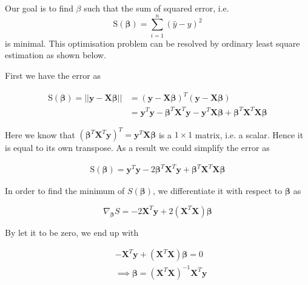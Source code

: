  \begin{mscproof}
 	 Our goal is to find $\beta$ such that the sum of squared error, i.e. $$\text{S}(\boldsymbol{\beta})=\sum_{i=1}^n(\hat{y}-y)^2$$ is minimal. This optimisation problem can be resolved by ordinary least square estimation as shown below.
 
 First we have the error as
 
 \begin{equation}
 \begin{split}
 \text{S}(\boldsymbol{\beta})=||\boldsymbol{y}-\boldsymbol{X} \boldsymbol{\beta}||& =(\boldsymbol{y}-\boldsymbol{X}\boldsymbol{\beta})^T(\boldsymbol{y}-\boldsymbol{X}\boldsymbol{\beta})\\
 	& =\boldsymbol{y}^T\boldsymbol{y}-\boldsymbol{\beta}^T\boldsymbol{X}^T\boldsymbol{y}-\boldsymbol{y}^T\boldsymbol{X}\boldsymbol{\beta}+\boldsymbol{\beta}^T\boldsymbol{X}^T\boldsymbol{X}\boldsymbol{\beta}
\end{split}
 \end{equation}
 
 Here we know that $(\boldsymbol{\beta}^T\boldsymbol{X}^T\boldsymbol{y})^T=\boldsymbol{y}^T\boldsymbol{X}\boldsymbol{\beta}$ is a $1\times 1$ matrix, i.e. a scalar. Hence it is equal to its own transpose. As a result we could simplify the error as
 
 \begin{equation}
 	\begin{split}
 		\text{S}(\boldsymbol{\beta})=\boldsymbol{y}^T\boldsymbol{y}-2\boldsymbol{\beta}^T\boldsymbol{X}^T\boldsymbol{y}+\boldsymbol{\beta}^T\boldsymbol{X}^T\boldsymbol{X}\boldsymbol{\beta}
 	\end{split}
 \end{equation}
 
 In order to find the minimum of $S(\boldsymbol{\beta})$, we differentiate it with respect to $\boldsymbol{\beta}$ as 
 
 \begin{equation}
 	\nabla_{\boldsymbol{\beta}}S=-2\boldsymbol{X}^T\boldsymbol{y}+2(\boldsymbol{X}^T\boldsymbol{X})\boldsymbol{\beta}
 \end{equation}
 
 By let it to be zero, we end up with 
 
 \begin{equation}
 \begin{split}
 	 &	-\boldsymbol{X}^T\boldsymbol{y}+(\boldsymbol{X}^T\boldsymbol{X})\boldsymbol{\beta}=0 \\
 	& \implies \boldsymbol{\beta}= (\boldsymbol{X}^T\boldsymbol{X})^{-1}\boldsymbol{X}^T\boldsymbol{y}
 \end{split}
 \end{equation}
 
 \end{mscproof}
 

  